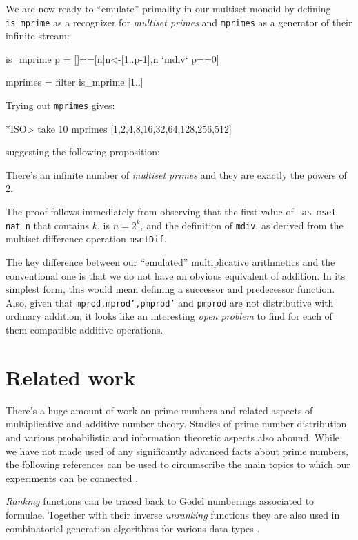 \documentclass[]{INCLUDES/llncs}
\begin{document}
We are now ready to ``emulate'' primality in our multiset monoid by defining
{\tt is\_mprime} as a recognizer for {\em multiset primes} and {\tt mprimes} as
a generator of their infinite stream:
\begin{code}
is_mprime p = []==[n|n<-[1..p-1],n `mdiv` p==0]

mprimes = filter is_mprime [1..]
\end{code}
Trying out {\tt mprimes} gives:
\begin{codex}
*ISO> take 10 mprimes
[1,2,4,8,16,32,64,128,256,512]
\end{codex}
suggesting the following proposition:
\begin{prop}
There's an infinite number of {\em multiset primes} and they are exactly the
powers of 2.
\end{prop}
The proof follows immediately from observing that the first value of {\tt
as mset nat n} that contains $k$, is $n=2^k$, and the definition of {\tt mdiv},
as derived from the multiset difference operation {\tt msetDif}.

The key difference between our ``emulated'' multiplicative arithmetics and the
conventional one is that we do not have an obvious equivalent of addition. In
its simplest form, this would mean defining a successor and predecessor
function. 
Also, given that {\tt mprod,mprod',pmprod'} and {\tt pmprod} are not
distributive with ordinary addition, it looks like an interesting {\em open problem}
to find for each of them compatible additive operations.

\section{Related work} \label{related}
There's a huge amount of work on prime numbers and related aspects of
multiplicative and additive number theory. Studies of prime number distribution
and various probabilistic and information theoretic aspects also abound.
While we have not made used of any significantly advanced facts about prime
numbers, the following references can be used to circumscribe the 
main topics to which our experiments can be connected
\cite{CP2005,Young98,Riesel85,Keller83,journals/fuin/CegielskiRV07}.

{\em Ranking} functions can be traced back to G\"{o}del numberings
\cite{Goedel:31,conf/icalp/HartmanisB74} associated to formulae. 
Together with their inverse {\em unranking} functions they are also 
used in combinatorial generation
algorithms for various data types
\cite{conf/mfcs/MartinezM03,knuth06draft,Ruskey90generatingbinary,Myrvold01rankingand}.
\end{document}
